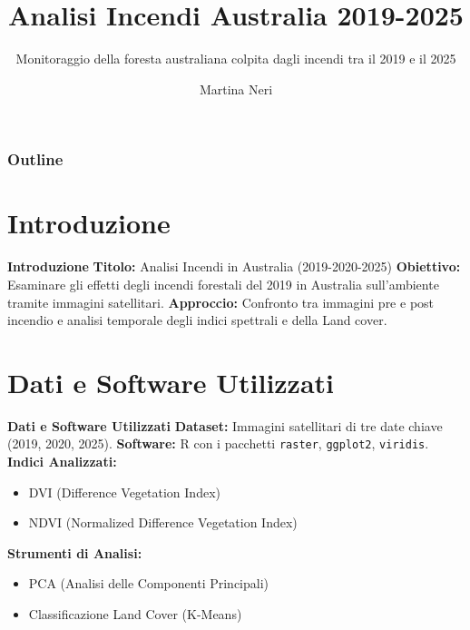 \documentclass{beamer}
\title{\textbf{\textcolor{verdeScuro}{Analisi Incendi Australia 2019-2025}}}
\subtitle{Monitoraggio della foresta australiana colpita dagli incendi tra il 2019 e il 2025}
\author{Martina Neri}
\begin{document}
\maketitle

\begin{frame}
\frametitle{Outline}
\tableofcontents
\end{frame}

\section{Introduzione}

\begin{frame}{\textbf{Introduzione}}
\textbf{Titolo:} Analisi Incendi in Australia (2019-2020-2025)
\newline
\newline
\textbf{Obiettivo:} Esaminare gli effetti degli incendi forestali del 2019 in Australia sull'ambiente tramite immagini satellitari.
\newline
\newline
\textbf{Approccio:} Confronto tra immagini pre e post incendio e analisi temporale degli indici spettrali e della Land cover.
\end{frame}

\section{Dati e Software Utilizzati}

\begin{frame}{\textbf{Dati e Software Utilizzati}}
\textbf{Dataset:} Immagini satellitari di tre date chiave (2019, 2020, 2025).
\newline
\newline
\textbf{Software:} R con i pacchetti \texttt{raster}, \texttt{ggplot2}, \texttt{viridis}.
\newline
\newline
\textbf{Indici Analizzati:}
\begin{itemize}
    \item DVI (Difference Vegetation Index)
    \item NDVI (Normalized Difference Vegetation Index)
\end{itemize}
\newline
\textbf{Strumenti di Analisi:}
\begin{itemize}
    \item PCA (Analisi delle Componenti Principali)
    \item Classificazione Land Cover (K-Means)
\end{itemize}
\end{frame}
\end{document}
